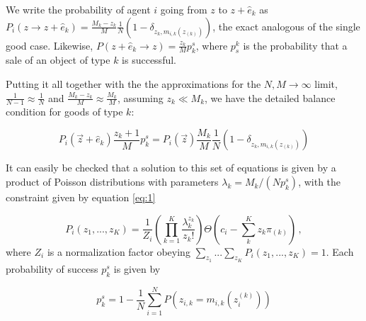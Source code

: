 We write the probability of agent $i$ going from $z$ to $z + \hat e_k$ as $P_i (z \to z + \hat e_k) = \frac{M_k - z_k}{M} \frac{1}{N} \left(1-\delta_{z_k,m_{i,k}(z_{(k)})}\right)$, the exact analogous of the single good case. Likewise, $P(z + \hat e_k \to z) = \frac{z_k}{M} p^s_k$, where $p_s^k$ is the probability that a sale of an object of type $k$ is successful.

Putting it all together with the the approximations for the $N, M \to \infty$ limit, $\frac{1}{N-1} \approx \frac{1}{N}$ and $\frac{M_k - z_k}{M} \approx \frac{M_k}{M}$, assuming $z_k \ll M_k$, we have the detailed balance condition for goods of type $k$:

\begin{equation}
\label{Eq:MasterEq3_2Goods_1Guy}
P_i(\vec z+\hat e_k)\frac{z_k+1}{M}p^s_{k}=
P_i(\vec z)  \frac{M_k}{M} \frac{1}{N} \left(1-\delta_{z_k,m_{i,k}(z_{(k)})}\right) 
\end{equation}

It can easily be checked that a solution to this set of equations is given by a product of Poisson distributions with parameters $\lambda_k=M_k/(N p^s_{k})$, with the constraint given by equation \eqref{eq:1}

\begin{equation}
P_i(z_1,..., z_{K}) = \frac{1}{Z_i} \left( \prod_{k=1}^{K}\frac{\lambda^{z_k}_k}{z_k!}\right) \Theta\left(c_i - \sum_k^{K} z_k \pi_{(k)}\right)\,,
\label{Eq:ME_solution_2Goods}
\end{equation}
where $Z_i$ is a normalization factor obeying $\sum_{z_1}...  \sum_{z_{K}}  P_i(z_1, ..., z_{K}) = 1$. Each probability of success $p_k^s$ is given by

\begin{equation}
p^s_{k} = 1 - \frac{1}{N}\sum_{i=1}^N P\left(z_{i,k}=m_{i,k}(z_i^{(k)})\right)
\label{eq:ps_Kobjs}
\end{equation}

